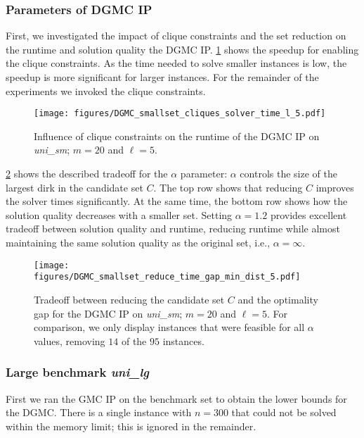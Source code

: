 \documentclass[letterpaper, 10 pt, conference]{ieeeconf}
\newcommand{\smallFixM}{\emph{uni\_sm}}
\newcommand{\largeFixM}{\emph{uni\_lg}}
\newcommand{\gmcip}{GMC IP}
\newcommand{\dgmcip}{DGMC IP}
\begin{document}
\subsubsection{Parameters of \dgmcip{}}

First, we investigated the impact of clique constraints and the set reduction on the runtime and solution quality the \dgmcip{}.
\cref{fig:ipparam_clique_time} shows the speedup for enabling the clique constraints.
As the time needed to solve smaller instances is low, the speedup is more significant for larger instances.
For the remainder of the experiments we invoked the clique constraints.

\begin{figure}[htb]
    \centering
    \texttt{[image: figures/DGMC\_smallset\_cliques\_solver\_time\_l\_5.pdf]}
    \caption{\label{fig:ipparam_clique_time}
    Influence of clique constraints on the runtime of the \dgmcip{} on \smallFixM{}; $m=20$ and $\ell=5$.}
\end{figure}

\cref{fig:dgmc_small} shows the described tradeoff for the $\alpha$ parameter:
$\alpha$ controls the size of the largest dirk in the candidate set $C$.
The top row shows that reducing $C$ improves the solver times significantly.
At the same time, the bottom row shows how the solution quality decreases with a smaller set.
Setting $\alpha = 1.2$ provides excellent tradeoff between solution quality and runtime,
reducing runtime while almost maintaining the same solution quality as the original set, i.e., $\alpha = \infty$.
 
\begin{figure}[htb]
    \centering
    \texttt{[image: figures/DGMC\_smallset\_reduce\_time\_gap\_min\_dist\_5.pdf]}
    \caption{\label{fig:dgmc_small}
        Tradeoff between reducing the candidate set $C$ and the optimality gap for the \dgmcip{} on \smallFixM{};
    $m=20$ and $\ell=5$. For comparison, we only display instances that were feasible for all $\alpha$ values, removing $14$ of the $95$ instances.}
\end{figure}

\subsubsection{Large benchmark \largeFixM{}}
First we ran the \gmcip{} on the benchmark set to obtain the lower bounds for the DGMC.
There is a single instance with $n=300$ that could not be solved within the memory limit;
this is ignored in the remainder.
\end{document}
